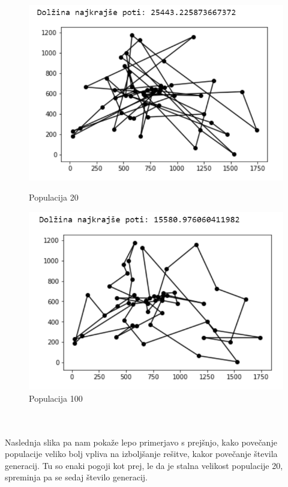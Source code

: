 \documentclass[12pt,a4paper]{amsart}
\theoremstyle{definition} %
\theoremstyle{plain} %
\begin{document}
\begin{figure}[h!]
\begin{minipage}[t]{0.48\textwidth}
\includegraphics[width=\linewidth,keepaspectratio=true]{primer-pop1}
\caption{Populacija 20}
\label{pop1}
\end{minipage}
\hspace*{\fill} %
\begin{minipage}[t]{0.48\textwidth}
\includegraphics[width=\linewidth,keepaspectratio=true]{primer-pop2}
\caption{Populacija 100}
\label{pop2}
\end{minipage}
\end{figure}
\\
\\
Naslednja slika pa nam pokaže lepo primerjavo s prejšnjo, kako povečanje populacije veliko bolj vpliva na izboljšanje rešitve, kakor povečanje števila generacij. Tu so enaki pogoji kot prej, le da je stalna velikost populacije 20, spreminja pa se sedaj število generacij. 
\end{document}
